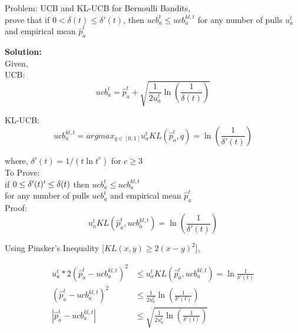 \documentclass{article}
\begin{document}
Problem: UCB and KL-UCB for Bernoulli Bandits, \\
prove that if $0 < \delta(t) \le \delta'(t)$, then $ucb_a^t \le ucb_a^{kl,t}$ for any number of pulls $u_a^t$ and empirical mean $\hat{p}_a^t$

\textbf{Solution:} \\
Given,  \\
UCB: \\
\begin{equation*}
    ucb_a^t = \hat{p}_a^t + \sqrt{\frac{1}{2u_a^t}\ln(\frac{1}{\delta(t)})}
\end{equation*}

KL-UCB: \\
\begin{equation*}
    ucb_a^{kl,t} = argmax_{q \in [0, 1]} {u_a^t KL(\hat{p}_a^t, q) = \ln(\frac{1}{\delta'(t)})}
\end{equation*}

where, $\delta'(t) = 1/(t{\ln t}^c)$ for $c \ge 3$ \\

To Prove: \\
if $0 \le \delta'(t) \rq \le \delta(t)$ then $ucb_a^t \le ucb_a^{kl,t}$ \\
for any number of pulls $ucb_a^t$ and empirical mean $\hat{p}_a^t$ \\

Proof: \\
\begin{equation*}
    u_a^t KL(\hat{p}_a^t, ucb_a^{kl,t}) = \ln(\frac{1}{\delta'(t)})
\end{equation*}

Using Pinsker's Inequality [$KL(x, y) \ge 2{(x - y)}^2$],

    \begin{align*}
        u_a^t * 2{(\hat{p}_a^t - ucb_a^{kl,t})}^2 &\le u_a^t KL(\hat{p}_a^t, ucb_a^{kl,t}) = \ln{\frac{1}{\delta'(t)}}\\
        (\hat{p}_a^t - ucb_a^{kl,t})^2 &\le \frac{1}{2u_a^t} \ln(\frac{1}{\delta'(t)}) \\
        |{\hat{p}_a^t - ucb_a^{kl,t}}| &\le \sqrt{\frac{1}{2u_a^t} \ln(\frac{1}{\delta'(t)})}
    \end{align*}
\end{document}
